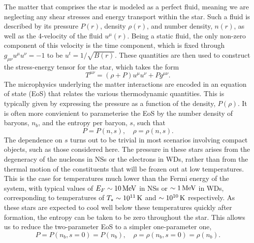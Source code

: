 The matter that comprises the star is modeled as a perfect fluid, meaning we are neglecting any shear stresses and energy transport within the star. Such a fluid is described by its pressure $P(r)$, density $\rho(r)$, and number density, $n(r)$, as well as the 4-velocity of the fluid $u^\mu(r)$. Being a static fluid, the only non-zero component of this velocity is the time component, which is fixed through $g_{\mu\nu}u^\mu u^\nu = -1$ to be $u^t = 1/\sqrt{B(r)}$.
These quantities are then used to construct the stress-energy tensor for the star, which takes the form
\begin{equation}
    T^{\mu\nu} = (\rho + P)u^\mu u^\nu + P g^{\mu\nu}.
\end{equation}
The microphysics underlying the matter interactions are encoded in an equation of state (EoS) that relates the various thermodynamic quantities. This is typically given by expressing the pressure as a function of the density, $P(\rho)$. It is often more convienient to parameterise the EoS by the number density of baryons, $n_b$, and the entropy per baryon, $s$, such that 
\begin{equation}
    P=P(n, s), \quad \rho = \rho(n, s).
\end{equation}
The dependence on $s$ turns out to be trivial in most scenarios involving compact objects, such as those considered here. The pressure in these stars arises from the degeneracy of the nucleons in NSs or the electrons in WDs, rather than from the thermal motion of the constituents that will be frozen out at low temperatures. This is the case for temperatures much lower than the Fermi energy of the system, with typical values of $E_F \sim 10{\rm \,MeV}$ in NSs or $\sim 1 {\rm \,MeV}$ in WDs, corresponding to temperatures of $T_\star\sim 10^{11}{\rm \,K}$ and $\sim 10^{10}{\rm \,K}$ respectively. As these stars are expected to cool well below these temperatures quickly after formation, the entropy can be taken to be zero throughout the star. This allows us to reduce the two-parameter EoS to a simpler one-parameter one,
\begin{equation}
    P=P(n_b, s = 0) = P(n_b), \quad \rho = \rho(n_b, s=0) = \rho(n_b).\label{eq:1_param_EoS}
\end{equation} 


